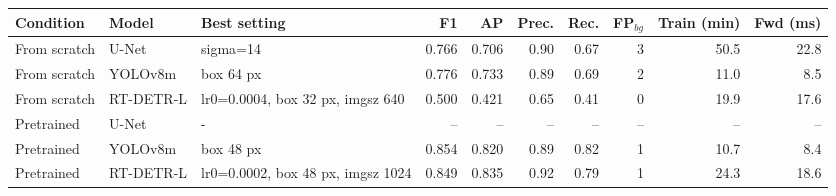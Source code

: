\begin{tabular}{lllrrrrrrr}
\toprule
Condition & Model & Best setting & F1 & AP & Prec. & Rec. & FP$_{bg}$ & Train (min) & Fwd (ms) \\
\midrule
From scratch & U-Net & sigma=14 & 0.766 & 0.706 & 0.90 & 0.67 & 3 & 50.5 & 22.8 \\
From scratch & YOLOv8m & box 64 px & 0.776 & 0.733 & 0.89 & 0.69 & 2 & 11.0 & 8.5 \\
From scratch & RT-DETR-L & lr0=0.0004, box 32 px, imgsz 640 & 0.500 & 0.421 & 0.65 & 0.41 & 0 & 19.9 & 17.6 \\
Pretrained & U-Net & - & -- & -- & -- & -- & -- & -- & -- \\
Pretrained & YOLOv8m & box 48 px & 0.854 & 0.820 & 0.89 & 0.82 & 1 & 10.7 & 8.4 \\
Pretrained & RT-DETR-L & lr0=0.0002, box 48 px, imgsz 1024 & 0.849 & 0.835 & 0.92 & 0.79 & 1 & 24.3 & 18.6 \\
\bottomrule
\end{tabular}
